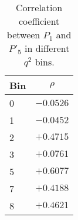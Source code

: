 \begin{table*}[!htb]

  \begin{center}
    \caption{Correlation coefficient between $P_1$ and $P'_5$ in different $q^2$ bins.}\label{tab:correlation}

    \begin{tabular}{l|c}
      Bin  & $\rho$ \\ 
      \hline
      \hline
      0 &  $-0.0526$  \\
      1 &  $-0.0452$  \\
      2 &  $+0.4715$  \\
      3 &  $+0.0761$  \\
      5 &  $+0.6077$  \\
      7 &  $+0.4188$  \\
      8 &  $+0.4621$  \\

    \end{tabular}
  \end{center}
\end{table*}




